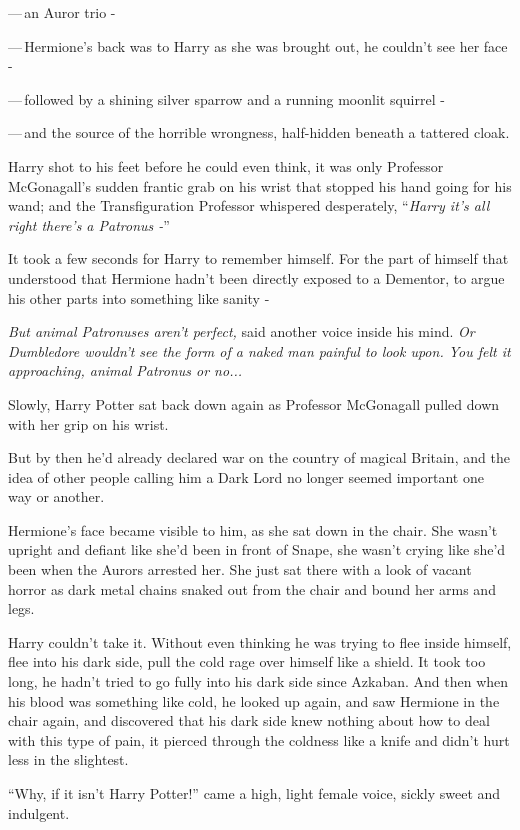 ---\,an Auror trio -

---\,Hermione's back was to Harry as she was brought out, he couldn't see her face -

---\,followed by a shining silver sparrow and a running moonlit squirrel -

---\,and the source of the horrible wrongness, half-hidden beneath a tattered cloak.

Harry shot to his feet before he could even think, it was only Professor McGonagall's sudden frantic grab on his wrist that stopped his hand going for his wand; and the Transfiguration Professor whispered desperately, ``\emph{Harry it's all right there's a Patronus -}''

It took a few seconds for Harry to remember himself. For the part of himself that understood that Hermione hadn't been directly exposed to a Dementor, to argue his other parts into something like sanity -

\emph{But animal Patronuses aren't perfect,} said another voice inside his mind. \emph{Or Dumbledore wouldn't see the form of a naked man painful to look upon. You felt it approaching, animal Patronus or no...}

Slowly, Harry Potter sat back down again as Professor McGonagall pulled down with her grip on his wrist.

But by then he'd already declared war on the country of magical Britain, and the idea of other people calling him a Dark Lord no longer seemed important one way or another.

Hermione's face became visible to him, as she sat down in the chair. She wasn't upright and defiant like she'd been in front of Snape, she wasn't crying like she'd been when the Aurors arrested her. She just sat there with a look of vacant horror as dark metal chains snaked out from the chair and bound her arms and legs.

Harry couldn't take it. Without even thinking he was trying to flee inside himself, flee into his dark side, pull the cold rage over himself like a shield. It took too long, he hadn't tried to go fully into his dark side since Azkaban. And then when his blood was something like cold, he looked up again, and saw Hermione in the chair again, and discovered that his dark side knew nothing about how to deal with this type of pain, it pierced through the coldness like a knife and didn't hurt less in the slightest.

``Why, if it isn't Harry Potter!'' came a high, light female voice, sickly sweet and indulgent.

